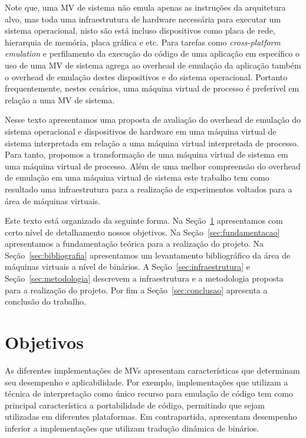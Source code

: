 \documentclass[11pt,twoside]{article}
\begin{document}
Note que, uma MV de sistema não emula apenas as instruções da arquitetura alvo, mas toda uma infraestrutura de hardware
necessária para executar um sistema operacional, nisto são está incluso dispositivos como placa de rede, hierarquia de memória,
placa gráfica e etc. Para tarefas como \textit{cross-platform emulation} e perfilamento da execução do código de uma aplicação
em específico o uso de uma MV de sistema agrega ao overhead de emulação da aplicação também o overhead de emulação destes 
dispositivos e do sistema operacional. Portanto frequentemente, nestes cenários, uma máquina virtual de processo é preferível
em relação a uma MV de sistema.

Nesse texto apresentamos uma proposta de avaliação do overhead de emulação do sistema operacional e dispositivos de hardware
em uma máquina virtual de sistema interpretada em relação a uma máquina virtual interpretada de processo. Para tanto, propomos
a transformação de uma máquina virtual de sistema em uma máquina virtual de processo. Além de uma melhor compreensão do overhead
de emulação em uma máquina virtual de sistema este trabalho tem como resultado uma infraestrutura para a realização de experimentos
voltados para a área de máquinas virtuais. 

Este texto está organizado da seguinte forma. Na Seção~\ref{sec:objetivos} apresentamos com certo nível de detalhamento nossos objetivos. 
Na Seção~\ref{sec:fundamentacao} apresentamos a fundamentação teórica para a realização do projeto. Na Seção~\ref{sec:bibliografia} apresentamos
um levantamento bibliográfico da área de máquinas virtuais a nível de binários. A Seção~\ref{sec:infraestrutura} e Seção~\ref{sec:metodologia}
descrevem a infraestrutura e a metodologia proposta para a realização do projeto. Por fim a Seção~\ref{sec:conclusao} apresenta a conclusão do trabalho. 
  
  
  
  
  
  
  
\section{Objetivos} \label{sec:objetivos}
As diferentes implementações de MVs apresentam características que determinam seu desempenho e aplicabilidade.
Por exemplo, implementações que utilizam a técnica de interpretação como único recurso para emulação de código tem como principal característica a portabilidade de código, permitindo que sejam utilizadas em diferentes plataformas. 
Em contrapartida, apresentam desempenho inferior a implementações que utilizam tradução dinâmica de binários.
\end{document}
